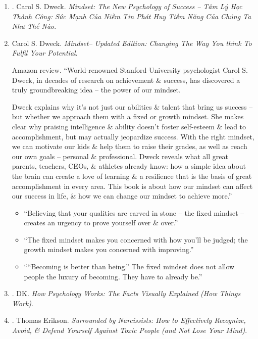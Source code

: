 \documentclass{article}
\begin{document}
\begin{enumerate}
	\item \cite{Dweck_mindset_VN}. {\sc Carol S. Dweck}. {\it Mindset: The New Psychology of Success -- Tâm Lý Học Thành Công: Sức Mạnh Của Niềm Tin Phát Huy Tiềm Năng Của Chúng Ta Như Thế Nào}.\hfill{\sf[done]}

	\item {\sc Carol S. Dweck}. {\it Mindset-- Updated Edition: Changing The Way You think To Fulfil Your Potential}. {}

	{\sf Amazon review.} ``World-renowned Stanford University psychologist {\sc Carol S. Dweck}, in decades of research on achievement \& success, has discovered a truly groundbreaking idea -- the power of our mindset.

	{\sc Dweck} explains why it's not just our abilities \& talent that bring us success -- but whether we approach them with a fixed or growth mindset. She makes clear why praising intelligence \& ability doesn't foster self-esteem \& lead to accomplishment, but may actually jeopardize success. With the right mindset, we can motivate our kids \& help them to raise their grades, as well as reach our own goals -- personal \& professional. {\sc Dweck} reveals what all great parents, teachers, CEOs, \& athletes already know: how a simple idea about the brain can create a love of learning \& a resilience that is the basis of great accomplishment in every area. This book is about how our mindset can affect our success in life, \& how we can change our mindset to achieve more.''
	\begin{itemize}
		\item ``Believing that your qualities are carved in stone -- the fixed mindset -- creates an urgency to prove yourself over \& over.''
		\item ``The fixed mindset makes you concerned with how you'll be judged; the growth mindset makes you concerned with improving.''
		\item ````Becoming is better than being.'' The fixed mindset does not allow people the luxury of becoming. They have to already be.''
	\end{itemize}

	\item \cite{DK2018}. DK. {\it How Psychology Works: The Facts Visually Explained (How Things Work)}.\hfill{\sf[reading]}

	\item \cite{Erikson_narcisisst}. {\sc Thomas Erikson}. {\it Surrounded by Narcissists: How to Effectively Recognize, Avoid, \& Defend Yourself Against Toxic People (and Not Lose Your Mind)}. {}


\end{enumerate}
\end{document}
